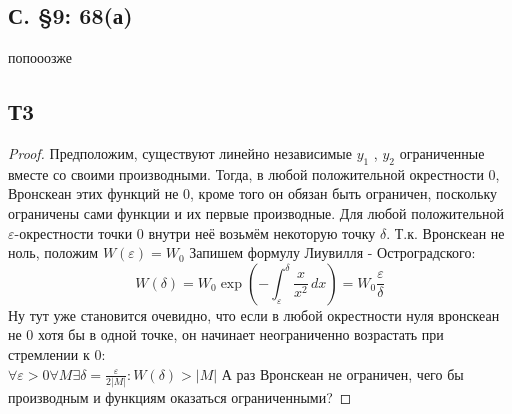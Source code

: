 \documentclass{article}
\begin{document}
\subsection{С. \S9: 68(а)}
попооозже

\subsection{Т3} 
\begin{proof}
Предположим, существуют линейно независимые $y_1$ , $y_2$ ограниченные вместе со своими производными. Тогда, в любой положительной окрестности 0, Вронскеан этих функций не 0, кроме того он обязан быть ограничен, поскольку ограничены сами функции и их первые производные. Для любой положительной $\varepsilon$-окрестности точки 0 внутри неё возьмём некоторую точку $\delta$. Т.к. Вронскеан не ноль, положим $W(\varepsilon)=W_0$ Запишем формулу Лиувилля - Остроградского:
\begin{equation}
    W(\delta)=W_0 \exp \left(- \int^{\delta}_{\varepsilon} \frac{x}{x^2} \, dx  \right) = W_0 \frac{\varepsilon}{\delta}
\end{equation}
Ну тут уже становится очевидно, что если в любой окрестности нуля вронскеан не 0 хотя бы в одной точке, он начинает неограниченно возрастать при стремлении к 0:\\
$\forall  \varepsilon > 0 \forall M \exists \delta =  \frac{\varepsilon}{2|M|}: W(\delta)>|M|$
А раз Вронскеан не ограничен, чего бы производным и функциям оказаться ограниченными?
\end{proof}
\end{document}
